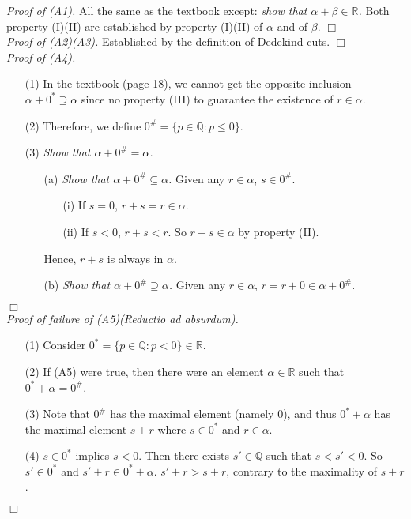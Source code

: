 \documentclass{article}
\begin{document}
\emph{Proof of (A1).}
All the same as the textbook except:
\emph{show that $\alpha+\beta \in \mathbb{R}$.}
Both property (I)(II) are established by property (I)(II) of $\alpha$ and of $\beta$.
$\Box$ \\

\emph{Proof of (A2)(A3).}
Established by the definition of Dedekind cuts.
$\Box$ \\

\emph{Proof of (A4).}
\begin{enumerate}
\item[(1)]
In the textbook (page 18),
we cannot get the opposite inclusion $\alpha + 0^* \supseteq \alpha$
since no property (III) to guarantee the existence of $r \in \alpha$.
\item[(2)]
Therefore, we define $0^{\#} = \{ p \in \mathbb{Q} : p \leq 0 \}$.
\item[(3)]
\emph{Show that $\alpha + 0^{\#} = \alpha$.}
  \begin{enumerate}
  \item[(a)]
  \emph{Show that $\alpha + 0^{\#} \subseteq \alpha$.}
  Given any $r \in \alpha$, $s \in 0^{\#}$.
    \begin{enumerate}
    \item[(i)]
    If $s = 0$, $r+s = r \in \alpha$.
    \item[(ii)]
    If $s < 0$, $r+s < r$. So $r+s \in \alpha$ by property (II).
    \end{enumerate}
  Hence, $r+s$ is always in $\alpha$.
  \item[(b)]
  \emph{Show that $\alpha + 0^{\#} \supseteq \alpha$.}
  Given any $r \in \alpha$, $r = r + 0 \in \alpha + 0^{\#}$.
  \end{enumerate}
\end{enumerate}
$\Box$ \\

\emph{Proof of failure of (A5)(Reductio ad absurdum).}
\begin{enumerate}
\item[(1)]
Consider $0^{*} = \{ p \in \mathbb{Q} : p < 0 \} \in \mathbb{R}$.
\item[(2)]
If (A5) were true,
then there were an element $\alpha \in \mathbb{R}$ such that $0^{*} + \alpha = 0^{\#}$.
\item[(3)]
Note that $0^{\#}$ has the maximal element (namely $0$), and thus
$0^{*} + \alpha$ has the maximal element $s+r$ where $s \in 0^{*}$ and $r \in \alpha$.
\item[(4)]
$s \in 0^{*}$ implies $s < 0$.
Then there exists $s' \in \mathbb{Q}$ such that $s < s' < 0$.
So $s' \in 0^{*}$ and $s'+r \in 0^{*} + \alpha$.
$s'+r > s+r$, contrary to the maximality of $s+r$.
\end{enumerate}
$\Box$ \\\\




\end{document}
